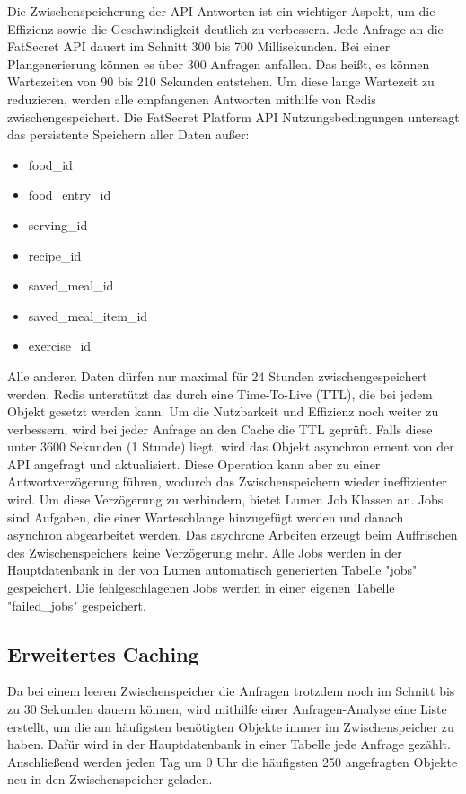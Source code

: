 Die Zwischenspeicherung der API Antworten ist ein wichtiger Aspekt, um die Effizienz sowie die Geschwindigkeit deutlich zu verbessern. Jede Anfrage an die FatSecret API dauert im Schnitt 300 bis 700 Millisekunden. Bei einer Plangenerierung können es über 300 Anfragen anfallen. Das heißt, es können Wartezeiten von 90 bis 210 Sekunden entstehen. Um diese lange Wartezeit zu reduzieren, werden alle empfangenen Antworten mithilfe von Redis zwischengespeichert. Die FatSecret Platform API Nutzungsbedingungen untersagt das persistente Speichern aller Daten außer:
\begin{itemize}
\item{food\_id}
\item{food\_entry\_id}
\item{serving\_id}
\item{recipe\_id}
\item{saved\_meal\_id}
\item{saved\_meal\_item\_id}
\item{exercise\_id}
\end{itemize}

Alle anderen Daten dürfen nur maximal für 24 Stunden zwischengespeichert werden. Redis unterstützt das durch eine Time-To-Live (TTL), die bei jedem Objekt gesetzt werden kann. Um die Nutzbarkeit und Effizienz noch weiter zu verbessern, wird bei jeder Anfrage an den Cache die TTL geprüft. Falls diese unter 3600 Sekunden (1 Stunde) liegt, wird das Objekt asynchron erneut von der API angefragt und aktualisiert. Diese Operation kann aber zu einer Antwortverzögerung führen, wodurch das Zwischenspeichern wieder ineffizienter wird. Um diese Verzögerung zu verhindern, bietet Lumen Job Klassen an. Jobs sind Aufgaben, die einer Warteschlange hinzugefügt werden und danach asynchron abgearbeitet werden. Das asychrone Arbeiten erzeugt beim Auffrischen des Zwischenspeichers keine Verzögerung mehr. Alle Jobs werden in der Hauptdatenbank in der von Lumen automatisch generierten Tabelle "jobs" gespeichert. Die fehlgeschlagenen Jobs werden in einer eigenen Tabelle "failed\_jobs" gespeichert.

\subsection{Erweitertes Caching}

Da bei einem leeren Zwischenspeicher die Anfragen trotzdem noch im Schnitt bis zu 30 Sekunden dauern können, wird mithilfe einer Anfragen-Analyse eine Liste erstellt, um die am häufigsten benötigten Objekte immer im Zwischenspeicher zu haben. Dafür wird in der Hauptdatenbank in einer Tabelle jede Anfrage gezählt. Anschließend werden jeden Tag um 0 Uhr die häufigsten 250 angefragten Objekte neu in den Zwischenspeicher geladen.

